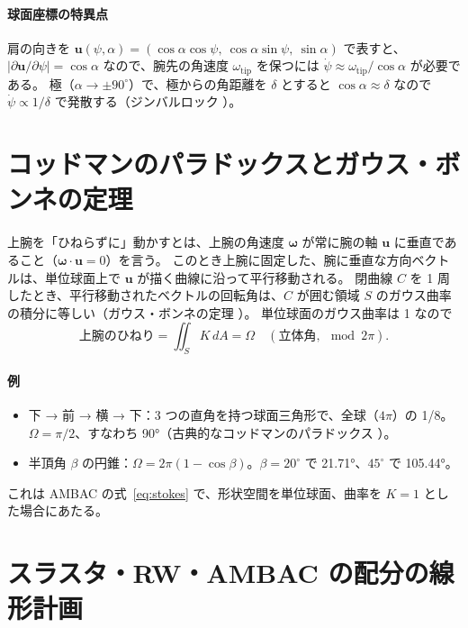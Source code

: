\paragraph{球面座標の特異点}
肩の向きを $\bm u(\psi,\alpha) = (\cos\alpha\cos\psi,\ \cos\alpha\sin\psi,\ \sin\alpha)$ で表すと、
$|\partial\bm u/\partial\psi| = \cos\alpha$ なので、腕先の角速度 $\omega_{\text{tip}}$ を保つには $\dot\psi\approx\omega_{\text{tip}}/\cos\alpha$ が必要である。
極（$\alpha\to\pm90^\circ$）で、極からの角距離を $\delta$ とすると $\cos\alpha\approx\delta$ なので $\dot\psi\propto1/\delta$ で発散する（ジンバルロック \cite{R18}）。

\section{コッドマンのパラドックスとガウス・ボンネの定理}\label{app:codman}

上腕を「ひねらずに」動かすとは、上腕の角速度 $\bm\omega$ が常に腕の軸 $\bm u$ に垂直であること（$\bm\omega\cdot\bm u=0$）を言う。
このとき上腕に固定した、腕に垂直な方向ベクトルは、単位球面上で $\bm u$ が描く曲線に沿って平行移動される。
閉曲線 $C$ を 1 周したとき、平行移動されたベクトルの回転角は、$C$ が囲む領域 $S$ のガウス曲率の積分に等しい（ガウス・ボンネの定理 \cite{R11}）。
単位球面のガウス曲率は 1 なので
\begin{equation}
\text{上腕のひねり} = \iint_S K\,dA = \Omega\quad(\text{立体角},\ \bmod 2\pi).
\end{equation}

\paragraph{例}
\begin{itemize}
\item 下 → 前 → 横 → 下：3 つの直角を持つ球面三角形で、全球（$4\pi$）の 1/8。$\Omega=\pi/2$、すなわち 90°（古典的なコッドマンのパラドックス \cite{R34,R35}）。
\item 半頂角 $\beta$ の円錐：$\Omega = 2\pi(1-\cos\beta)$。$\beta=20^\circ$ で 21.71°、$45^\circ$ で 105.44°。
\end{itemize}
これは AMBAC の式~\eqref{eq:stokes} で、形状空間を単位球面、曲率を $K=1$ とした場合にあたる。

\section{スラスタ・RW・AMBAC の配分の線形計画}\label{app:lp}

